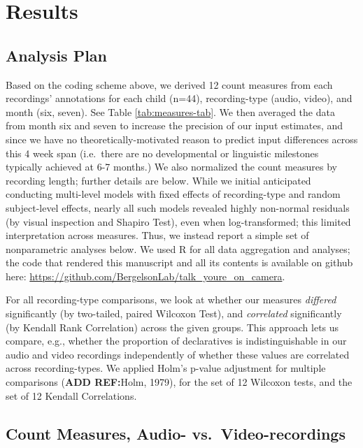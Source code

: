\documentclass[floatsintext,man]{apa6}
\theoremstyle{definition}
\theoremstyle{definition}
\theoremstyle{definition}
\theoremstyle{remark}
\begin{document}
\section{Results}\label{results}

\subsection{Analysis Plan}\label{analysis-plan}

Based on the coding scheme above, we derived 12 count measures from each
recordings' annotations for each child (n=44), recording-type (audio,
video), and month (six, seven). See Table \ref{tab:measures-tab}. We
then averaged the data from month six and seven to increase the
precision of our input estimates, and since we have no
theoretically-motivated reason to predict input differences across this
4 week span (i.e.~there are no developmental or linguistic milestones
typically achieved at 6-7 months.) We also normalized the count measures
by recording length; further details are below. While we initial
anticipated conducting multi-level models with fixed effects of
recording-type and random subject-level effects, nearly all such models
revealed highly non-normal residuals (by visual inspection and Shapiro
Test), even when log-transformed; this limited interpretation across
measures. Thus, we instead report a simple set of nonparametric analyses
below. We used R for all data aggregation and analyses; the code that
rendered this manuscript and all its contents is available on github
here: \url{https://github.com/BergelsonLab/talk_youre_on_camera}.

For all recording-type comparisons, we look at whether our measures
\emph{differed} significantly (by two-tailed, paired Wilcoxon Test), and
\emph{correlated} significantly (by Kendall Rank Correlation) across the
given groups. This approach lets us compare, e.g., whether the
proportion of declaratives is indistinguishable in our audio and video
recordings independently of whether these values are correlated across
recording-types. We applied Holm's p-value adjustment for multiple
comparisons (\textbf{ADD REF:}Holm, 1979), for the set of 12 Wilcoxon
tests, and the set of 12 Kendall Correlations.

\subsection{Count Measures, Audio-
vs.~Video-recordings}\label{count-measures-audio--vs.video-recordings}
\end{document}
